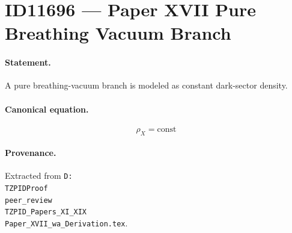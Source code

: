 \section*{ID11696 --- Paper XVII Pure Breathing Vacuum Branch}

\paragraph{Statement.}
A pure breathing-vacuum branch is modeled as constant dark-sector density.

\paragraph{Canonical equation.}
\[
\rho_X=\mathrm{const}
\]

\paragraph{Provenance.}
Extracted from \texttt{D:\\TZPIDProof\\peer\_review\\TZPID\_Papers\_XI\_XIX\\Paper\_XVII\_wa\_Derivation.tex}.
